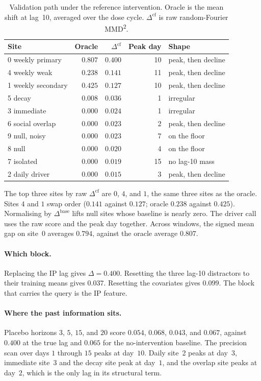 \documentclass[11pt]{article}
\begin{document}
\begin{table}[t]
\centering
\caption{Validation path under the reference intervention.
Oracle is the mean shift at lag~10, averaged over the dose cycle.
$\Delta^{\mathrm{cf}}$ is raw random-Fourier MMD\textsuperscript{2}.}
\label{tab:path}
\begin{tabular}{@{}lrrrl@{}}
\toprule
Site & Oracle & $\Delta^{\mathrm{cf}}$ & Peak day & Shape \\
\midrule
0 weekly primary & $0.807$ & $0.400$ & 10 & peak, then decline \\
4 weekly weak & $0.238$ & $0.141$ & 11 & peak, then decline \\
1 weekly secondary & $0.425$ & $0.127$ & 10 & peak, then decline \\
5 decay & $0.008$ & $0.036$ & 1 & irregular \\
3 immediate & $0.000$ & $0.024$ & 1 & irregular \\
6 social overlap & $0.000$ & $0.023$ & 2 & peak, then decline \\
9 null, noisy & $0.000$ & $0.023$ & 7 & on the floor \\
8 null & $0.000$ & $0.020$ & 4 & on the floor \\
7 isolated & $0.000$ & $0.019$ & 15 & no lag-10 mass \\
2 daily driver & $0.000$ & $0.015$ & 3 & peak, then decline \\
\bottomrule
\end{tabular}
\end{table}

The top three sites by raw $\Delta^{\mathrm{cf}}$ are $0$, $4$, and $1$, the same three sites as the oracle.
Sites $4$ and $1$ swap order ($0.141$ against $0.127$; oracle $0.238$ against $0.425$).
Normalising by $\Delta^{\mathrm{base}}$ lifts null sites whose baseline is nearly zero.
The driver call uses the raw score and the peak day together.
Across windows, the signed mean gap on site~0 averages $0.794$, against the oracle average $0.807$.

\paragraph{Which block.}
Replacing the IP lag gives $\Delta=0.400$.
Resetting the three lag-10 distractors to their training means gives $0.037$.
Resetting the covariates gives $0.099$.
The block that carries the query is the IP feature.

\paragraph{Where the past information sits.}
Placebo horizons $3$, $5$, $15$, and $20$ score $0.054$, $0.068$, $0.043$, and $0.067$, against $0.400$ at the true lag and $0.065$ for the no-intervention baseline.
The precision scan over days $1$ through $15$ peaks at day~$10$.
Daily site~2 peaks at day~$3$, immediate site~3 and the decay site peak at day~$1$, and the overlap site peaks at day~$2$, which is the only lag in its structural term.
\end{document}
